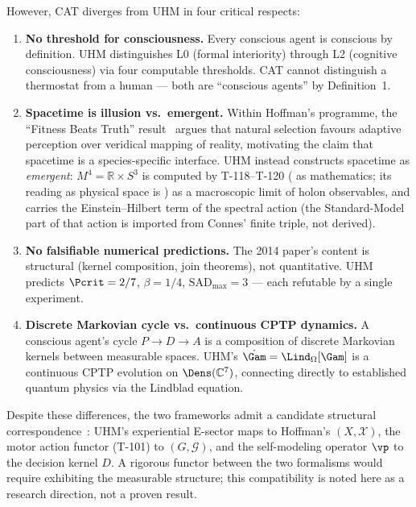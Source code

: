 However, CAT diverges from UHM in four critical respects:
\begin{enumerate}[leftmargin=2em]
  \item \textbf{No threshold for consciousness.} Every conscious agent is
        conscious by definition. UHM distinguishes L0 (formal interiority)
        through L2 (cognitive consciousness) via four computable thresholds.
        CAT cannot distinguish a thermostat from a human --- both are
        ``conscious agents'' by Definition~1.
  \item \textbf{Spacetime is illusion vs.\ emergent.} Within Hoffman's
        programme, the ``Fitness Beats Truth'' result~\cite{prakash2021fbt}
        argues that natural selection favours adaptive perception over
        veridical mapping of reality, motivating the claim that spacetime is
        a species-specific interface. UHM instead constructs spacetime as
        \emph{emergent}: $M^4 = \mathbb{R} \times S^3$ is computed by
        T-118--T-120 ( as mathematics; its reading as physical
        space is ) as a macroscopic limit of holon observables,
        and carries the Einstein--Hilbert term of the spectral action
        (the Standard-Model part of that action is imported from Connes'
        finite triple, not derived).
  \item \textbf{No falsifiable numerical predictions.} The 2014 paper's
        content is structural (kernel composition, join theorems), not
        quantitative. UHM predicts $\Pcrit = 2/7$, $\beta = 1/4$,
        $\mathrm{SAD}_{\max} = 3$ --- each refutable by a single experiment.
  \item \textbf{Discrete Markovian cycle vs.\ continuous CPTP dynamics.} A
        conscious agent's cycle $P \to D \to A$ is a composition of discrete
        Markovian kernels between measurable spaces. UHM's
        $\dot\Gam = \Lind_\Omega[\Gam]$ is a continuous CPTP evolution on
        $\Dens(\mathbb{C}^7)$, connecting directly to established quantum
        physics via the Lindblad equation.
\end{enumerate}

\noindent
Despite these differences, the two frameworks admit a candidate structural
correspondence~: UHM's experiential E-sector maps to Hoffman's
$(X, \mathcal{X})$, the motor action functor (T-101) to $(G, \mathcal{G})$,
and the self-modeling operator $\vp$ to the decision kernel $D$. A rigorous
functor between the two formalisms would require exhibiting the measurable
structure; this compatibility is noted here as a research direction, not a
proven result.

